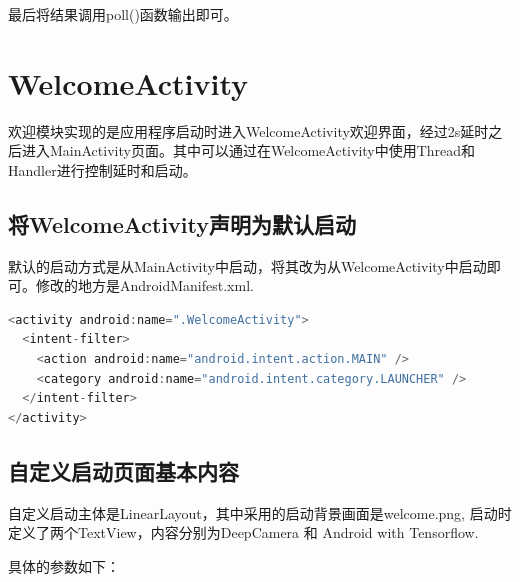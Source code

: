 \documentclass[UTF8, Microsoft YaHei]{book}
\begin{document}
	最后将结果调用poll()函数输出即可。
    
    \section{WelcomeActivity}
   	欢迎模块实现的是应用程序启动时进入WelcomeActivity欢迎界面，经过2s延时之后进入MainActivity页面。其中可以通过在WelcomeActivity中使用Thread和Handler进行控制延时和启动。

   	\subsection{将WelcomeActivity声明为默认启动}

   	默认的启动方式是从MainActivity中启动，将其改为从WelcomeActivity中启动即可。修改的地方是AndroidManifest.xml.

\begin{small}
\begin{lstlisting}[language=java]
<activity android:name=".WelcomeActivity">
  <intent-filter>
    <action android:name="android.intent.action.MAIN" />
    <category android:name="android.intent.category.LAUNCHER" />
  </intent-filter>
</activity>
\end{lstlisting}
\end{small}

    \subsection{自定义启动页面基本内容}

    自定义启动主体是LinearLayout，其中采用的启动背景画面是welcome.png, 启动时定义了两个TextView，内容分别为DeepCamera 和 Android with Tensorflow.

    具体的参数如下：
\end{document}
